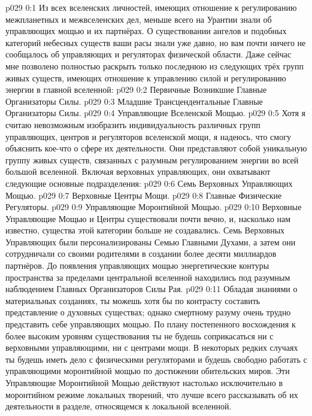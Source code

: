 \author{Всеобщий Цензор}
\vs p029 0:1 Из всех вселенских личностей, имеющих отношение к регулированию межпланетных и межвселенских дел, меньше всего на Урантии знали об управляющих мощью и их партнёрах. О существовании ангелов и подобных категорий небесных существ ваши расы знали уже давно, но вам почти ничего не сообщалось об управляющих и регуляторах физической области. Даже сейчас мне позволено полностью раскрыть только последнюю из следующих трёх групп живых существ, имеющих отношение к управлению силой и регулированию энергии в главной вселенной:
\vs p029 0:2 Первичные Возникшие Главные Организаторы Силы.
\vs p029 0:3 Младшие Трансцендентальные Главные Организаторы Силы.
\vs p029 0:4 Управляющие Вселенской Мощью.
\vs p029 0:5 \pc Хотя я считаю невозможным изобразить индивидуальность различных групп управляющих, центров и регуляторов вселенской мощи, я надеюсь, что смогу объяснить кое\hyp{}что о сфере их деятельности. Они представляют собой уникальную группу живых существ, связанных с разумным регулированием энергии во всей большой вселенной. Включая верховных управляющих, они охватывают следующие основные подразделения:
\vs p029 0:6 Семь Верховных Управляющих Мощью.
\vs p029 0:7 Верховные Центры Мощи.
\vs p029 0:8 Главные Физические Регуляторы.
\vs p029 0:9 Управляющие Моронтийной Мощью.
\vs p029 0:10 \pc Верховные Управляющие Мощью и Центры существовали почти вечно, и, насколько нам известно, существа этой категории больше не создавались. Семь Верховных Управляющих были персонализированы Семью Главными Духами, а затем они сотрудничали со своими родителями в создании более десяти миллиардов партнёров. До появления управляющих мощью энергетические контуры пространства за пределами центральной вселенной находились под разумным наблюдением Главных Организаторов Силы Рая.
\vs p029 0:11 Обладая знаниями о материальных созданиях, ты можешь хотя бы по контрасту составить представление о духовных существах; однако смертному разуму очень трудно представить себе управляющих мощью. По плану постепенного восхождения к более высоким уровням существования ты не будешь соприкасаться ни с верховными управляющими, ни с центрами мощи. В некоторых редких случаях ты будешь иметь дело с физическими регуляторами и будешь свободно работать с управляющими моронтийной мощью по достижении обительских миров. Эти Управляющие Моронтийной Мощью действуют настолько исключительно в моронтийном режиме локальных творений, что лучше всего рассказывать об их деятельности в разделе, относящемся к локальной вселенной.
